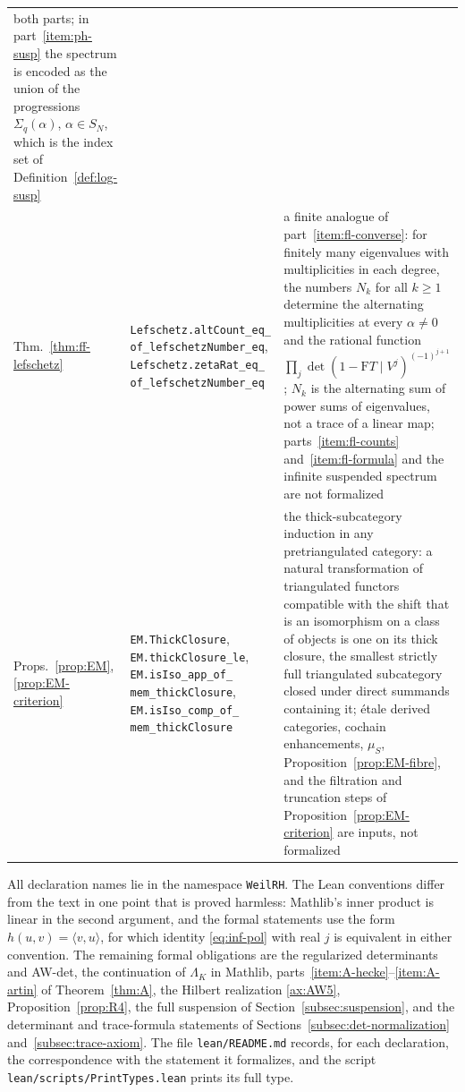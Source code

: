 \documentclass[11pt]{amsart}
\theoremstyle{plain}
\theoremstyle{definition}
\theoremstyle{remark}
\numberwithin{equation}{section}
\begin{document}
{\begin{longtable}{@{}>{\raggedright\arraybackslash}p{}
>{\raggedright\arraybackslash}p{}
>{\raggedright\arraybackslash}p{}@{}}
both parts; in part~\ref{item:ph-susp} the spectrum is encoded as the
union of the progressions $\Sigma_q(\alpha)$, $\alpha\in S_N$, which is
the index set of Definition~\ref{def:log-susp}\\
Thm.~\ref{thm:ff-lefschetz} &
\texttt{Lefschetz.\allowbreak{}altCount\_\allowbreak{}eq\_\allowbreak{}%
of\_\allowbreak{}lefschetzNumber\_\allowbreak{}eq},
\texttt{Lefschetz.\allowbreak{}zetaRat\_\allowbreak{}eq\_\allowbreak{}%
of\_\allowbreak{}lefschetzNumber\_\allowbreak{}eq} &
a finite analogue of part~\ref{item:fl-converse}: for finitely many
eigenvalues with multiplicities in each degree, the numbers $N_k$ for
all $k\ge1$ determine the alternating multiplicities at every
$\alpha\ne0$ and the rational function
$\prod_j\det(1-\mathrm FT\mid V^j)^{(-1)^{j+1}}$; $N_k$ is the
alternating sum of power sums of eigenvalues, not a trace of a linear
map; parts~\ref{item:fl-counts} and~\ref{item:fl-formula} and the
infinite suspended spectrum are not formalized\\
Props.~\ref{prop:EM}, \ref{prop:EM-criterion} &
\texttt{EM.\allowbreak{}ThickClosure},
\texttt{EM.\allowbreak{}thickClosure\_\allowbreak{}le},
\texttt{EM.\allowbreak{}isIso\_\allowbreak{}app\_\allowbreak{}of\_%
\allowbreak{}mem\_\allowbreak{}thickClosure},
\texttt{EM.\allowbreak{}isIso\_\allowbreak{}comp\_\allowbreak{}of\_%
\allowbreak{}mem\_\allowbreak{}thickClosure} &
the thick-subcategory induction in any pretriangulated category: a
natural transformation of triangulated functors compatible with the
shift that is an isomorphism on a class of objects is one on its thick
closure, the smallest strictly full triangulated subcategory closed
under direct summands containing it; \'etale derived categories,
cochain enhancements, $\mu_S$, Proposition~\ref{prop:EM-fibre}, and the
filtration and truncation steps of Proposition~\ref{prop:EM-criterion}
are inputs, not formalized\\
\end{longtable}
}

All declaration names lie in the namespace \texttt{WeilRH}. The Lean
conventions differ from the text in one point that is proved harmless:
Mathlib's inner product is linear in the second argument, and the
formal statements use the form $h(u,v)=\langle v,u\rangle$, for which
identity \eqref{eq:inf-pol} with real $j$ is equivalent in either
convention. The remaining formal obligations are the regularized
determinants and AW-det, the continuation of $\Lambda_K$ in Mathlib,
parts~\ref{item:A-hecke}--\ref{item:A-artin} of Theorem~\ref{thm:A},
the Hilbert realization \ref{ax:AW5}, Proposition~\ref{prop:R4}, the
full suspension of Section~\ref{subsec:suspension}, and the
determinant and trace-formula statements of
Sections~\ref{subsec:det-normalization} and~\ref{subsec:trace-axiom}.
 The file
\texttt{lean/README.md} records, for each declaration, the
correspondence with the statement it formalizes, and the script
\texttt{lean/scripts/PrintTypes.lean} prints its full type.
\end{document}
